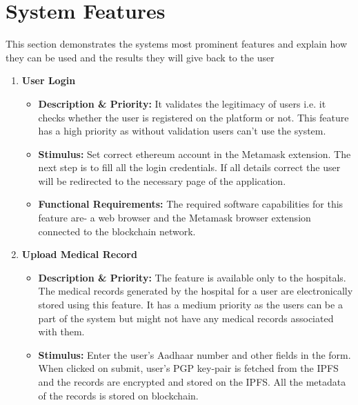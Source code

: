 \section {System Features}

This section demonstrates the systems most prominent features and explain how they can be used and the results they will give back to the user
\begin{enumerate}
	\item \textbf{User Login}
	   \begin{itemize}
	       \item \textbf{Description \& Priority:} It validates the legitimacy of users i.e. it checks whether the user is registered on the platform or not. This feature has a high priority as without validation users can't use the system.
	       \item \textbf{Stimulus:} Set correct ethereum account in the Metamask extension. The next step is to fill all the login credentials. If all details correct the user will be redirected to the necessary page of the application.
	       \item \textbf{Functional Requirements:} The required software capabilities for this feature are- a web browser and the Metamask browser extension connected to the blockchain network.
	   \end{itemize}
	\item \textbf{Upload Medical Record}
	    \begin{itemize}
	       \item \textbf{Description \& Priority:} The feature is available only to the hospitals. The medical records generated by the hospital for a user are electronically stored using this feature. It has a medium priority as the users can be a part of the system but might not have any medical records associated with them. 
	       \item \textbf{Stimulus:} Enter the user's Aadhaar number and other fields in the form. When clicked on submit, user's PGP key-pair is fetched from the IPFS and the records are encrypted and stored on the IPFS. All the metadata of the records is stored on blockchain.

\end{itemize}
\end{enumerate}
